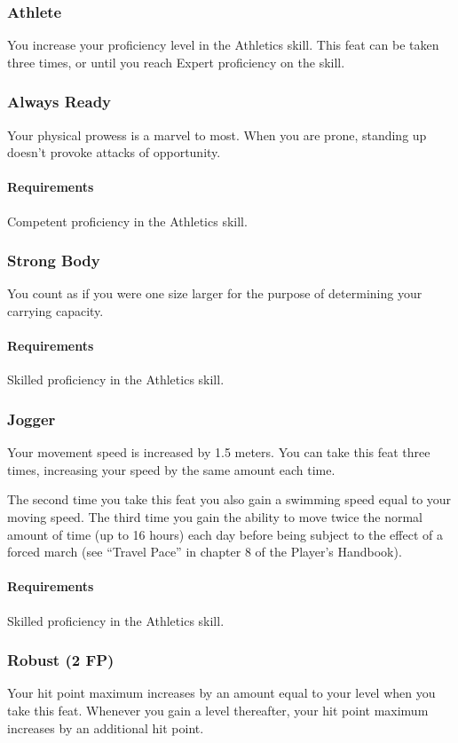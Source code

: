 \subsubsection{Athlete} \label{feat::athlete}
    You increase your proficiency level in the Athletics skill.
    This feat can be taken three times, or until you reach Expert proficiency on the skill.
\subsubsection{Always Ready} \label{feat::alwaysready}
    Your physical prowess is a marvel to most.
    When you are prone, standing up doesn't provoke attacks of opportunity.
    \paragraph{Requirements} Competent proficiency in the Athletics skill.
\subsubsection{Strong Body} \label{feat::strongbody}
    You count as if you were one size larger for the purpose of determining your carrying capacity.
    \paragraph{Requirements} Skilled proficiency in the Athletics skill.
\subsubsection{Jogger} \label{feat::jogger}
    Your movement speed is increased by 1.5 meters.
    You can take this feat three times, increasing your speed by the same amount each time.

    The second time you take this feat you also gain a swimming speed equal to your moving speed.
    The third time you gain the ability to move twice the normal amount of time (up to 16 hours) each day before being subject to the effect of a forced march (see ``Travel Pace'' in chapter 8 of the Player's Handbook).
    \paragraph{Requirements} Skilled proficiency in the Athletics skill.
\subsubsection{Robust (2 FP)} \label{feat::robust}
    Your hit point maximum increases by an amount equal to your level when you take this feat.
    Whenever you gain a level thereafter, your hit point maximum increases by an additional hit point.
